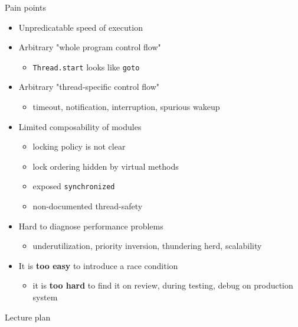 \newcommand{\painpointsslide}{
\begin{frame}{Pain points}

\begin{itemize}
  \item Unpredicatable speed of execution
  \item Arbitrary "whole program control flow"
  \begin{itemize}
    \item \texttt{Thread.start} looks like \texttt{goto}
  \end{itemize}
  \item Arbitrary "thread-specific control flow"
  \begin{itemize}
    \item timeout, notification, interruption, spurious wakeup
  \end{itemize}

  \item Limited composability of modules 
  \begin{itemize}
    \item locking policy is not clear
    \item lock ordering hidden by virtual methods
    \item exposed \texttt{synchronized}
    \item non-documented thread-safety    
  \end{itemize}

  \item Hard to diagnose performance problems 
  \begin{itemize}
    \item underutilization, priority inversion, thundering herd, scalability 
  \end{itemize}

  \item It is \textbf{too easy} to introduce a race condition
  \begin{itemize}
    \item it is \textbf{too hard} to find it on review, during testing, debug on production system
  \end{itemize}
\end{itemize}
\end{frame}  
}

\painpointsslide



\begin{frame}{Lecture plan}
\tableofcontents
\end{frame}

